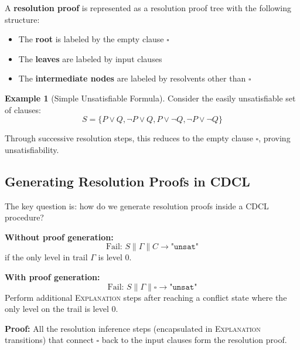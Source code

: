 \documentclass[11pt,a4paper]{article}
\theoremstyle{definition}
\newtheorem{example}{Example}[section]
\theoremstyle{plain}
\theoremstyle{remark}
\begin{document}
A \textbf{resolution proof} is represented as a resolution proof tree with the following structure:

\begin{itemize}
    \item The \textbf{root} is labeled by the empty clause $\square$
    \item The \textbf{leaves} are labeled by input clauses
    \item The \textbf{intermediate nodes} are labeled by resolvents other than $\square$
\end{itemize}

\begin{example}[Simple Unsatisfiable Formula]
Consider the easily unsatisfiable set of clauses:
\[
S = \{ P \lor Q, \neg P \lor Q, P \lor \neg Q, \neg P \lor \neg Q \}
\]

Through successive resolution steps, this reduces to the empty clause $\square$, proving unsatisfiability.
\end{example}

\subsection{Generating Resolution Proofs in CDCL}

The key question is: how do we generate resolution proofs inside a CDCL procedure?

\begin{tcolorbox}[colback=orange!5!white,colframe=orange!75!black,title=\textbf{CDCL Proof Generation}]
\textbf{Without proof generation:}
\[
\text{Fail: } S \parallel \Gamma \parallel C \longrightarrow \texttt{"unsat"}
\]
if the only level in trail $\Gamma$ is level 0.

\vspace{0.5em}

\textbf{With proof generation:}
\[
\text{Fail: } S \parallel \Gamma \parallel \square \longrightarrow \texttt{"unsat"}
\]
Perform additional \textsc{Explanation} steps after reaching a conflict state where the only level on the trail is level 0.

\vspace{0.5em}

\textbf{Proof:} All the resolution inference steps (encapsulated in \textsc{Explanation} transitions) that connect $\square$ back to the input clauses form the resolution proof.
\end{tcolorbox}
\end{document}
